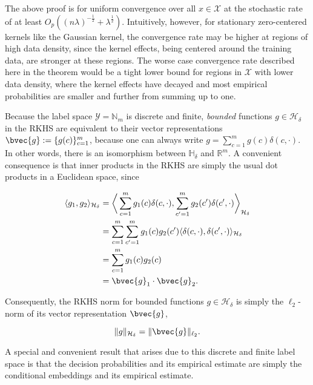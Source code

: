 \documentclass{llncs}
\numberwithin{equation}{section}
\numberwithin{table}{section}
\numberwithin{algorithm}{section}
\begin{document}
	The above proof is for uniform convergence over all $x \in \mathcal{X}$ at the stochastic rate of at least $O_{p}((n \lambda)^{-\frac{1}{2}} + \lambda^{\frac{1}{2}})$. Intuitively, however, for stationary zero-centered kernels like the Gaussian kernel, the convergence rate may be higher at regions of high data density, since the kernel effects, being centered around the training data, are stronger at these regions. The worse case convergence rate described here in the theorem would be a tight lower bound for regions in $\mathcal{X}$ with lower data density, where the kernel effects have decayed and most empirical probabilities are smaller and further from summing up to one.
	
	Because the label space $\mathcal{Y} = \mathbb{N}_{m}$ is discrete and finite, \textit{bounded} functions $g \in \mathcal{H}_{\delta}$ in the \gls{RKHS} are equivalent to their vector representations $\bvec{g} := \{g(c)\}_{c = 1}^{m}$, because one can always write $g = \sum_{c = 1}^{m} g(c) \delta(c, \cdot)$. In other words, there is an isomorphism between $\mathbb{H}_{\delta}$ and $\mathbb{R}^{m}$. A convenient consequence is that inner products in the \gls{RKHS} are simply the usual dot products in a Euclidean space, since
	
	\begin{equation}
	\begin{aligned}
	\langle g_{1}, g_{2} \rangle_{\mathcal{H}_{\delta}} &= \bigg\langle \sum_{c = 1}^{m} g_{1}(c) \delta(c, \cdot), \sum_{c' = 1}^{m} g_{2}(c') \delta(c', \cdot)  \bigg\rangle_{\mathcal{H}_{\delta}} \\
	&= \sum_{c = 1}^{m} \sum_{c' = 1}^{m} g_{1}(c) g_{2}(c') \langle \delta(c, \cdot), \delta(c', \cdot) \rangle_{\mathcal{H}_{\delta}} \\
	&= \sum_{c = 1}^{m} g_{1}(c) g_{2}(c) \\
	&= \bvec{g}_{1} \cdot \bvec{g}_{2}.
	\end{aligned}
	\end{equation}
	
	Consequently, the \gls{RKHS} norm for bounded functions $g \in \mathcal{H}_{\delta}$ is simply the $\ell_{2}$-norm of its vector representation $\bvec{g}$,
	
	\begin{equation}
	\lVert g \rVert_{\mathcal{H}_{\delta}} = \lVert \bvec{g} \rVert_{\ell_{2}}.
	\label{eq:RKHS_norm_is_l2_norm}
	\end{equation}
	
	A special and convenient result that arises due to this discrete and finite label space is that the decision probabilities and its empirical estimate are simply the conditional embeddings and its empirical estimate.
	
\end{document}
